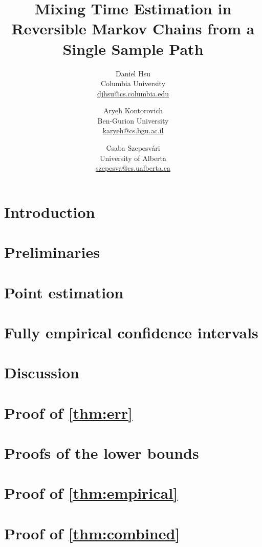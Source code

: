 \documentclass{article}
\title{%
  Mixing Time Estimation in Reversible Markov Chains from a Single
  Sample Path%
}
\author{%
  Daniel Hsu \\
  Columbia University \\
  \url{djhsu@cs.columbia.edu}
  \and
  Aryeh Kontorovich \\
  Ben-Gurion University \\
  \url{karyeh@cs.bgu.ac.il}
  \and
  Csaba Szepesv\'ari \\
  University of Alberta \\
  \url{szepesva@cs.ualberta.ca}
}
\begin{document}
\maketitle

\begin{abstract} 

\end{abstract} 

\section{Introduction}\label{sec:intro}


\section{Preliminaries}\label{sec:prelim}


\section{Point estimation}\label{sec:rates}


\section{Fully empirical confidence intervals}\label{sec:empirical}


\section{Discussion}\label{sec:discussion}





\appendix

\section{Proof of \cref{thm:err}}\label{app:upper}


\section{Proofs of the lower bounds}\label{app:lower}


\section{Proof of \cref{thm:empirical}}\label{app:empirical}


\section{Proof of \cref{thm:combined}}\label{app:combined}

\end{document}
